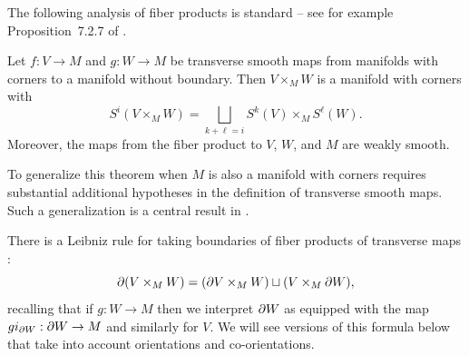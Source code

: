 The following analysis of fiber products is standard -- see for example Proposition~7.2.7 of \cite{MaDo92}. 

\begin{theorem} \label{pullback}
	Let $f \colon V \to M$ and $g \colon W \to M$ be transverse smooth maps from manifolds with corners to a manifold without boundary. Then $V \times_M W$ is a manifold with corners with 
	\begin{equation*}
	S^i(V \times_M W) = \bigsqcup_{k + \ell = i} S^k(V) \times_M S^\ell(W).
	\end{equation*}
	Moreover, the maps from the fiber product to $V$, $W$, and $M$ are weakly smooth.
\end{theorem}

To generalize this theorem when $M$ is also a manifold with corners requires substantial additional hypotheses in the definition of transverse smooth maps.
Such a generalization is a central result in \cite{Joy12}.

There is a Leibniz rule for taking boundaries of fiber products of transverse maps \cite[Proposition 6.7]{Joy12}: 
\begin{equation}\label{E: product boundary}
\partial(V\times_M W)=(\partial V \times_M W)\sqcup (V\times_M \partial W),
\end{equation}
recalling that if $g:W\to M$ then we interpret $\partial W$ as equipped with the map $gi_{\partial W}:\partial W\to M$ and similarly for $V$. We will see versions of this formula below that take into account orientations and co-orientations. 


